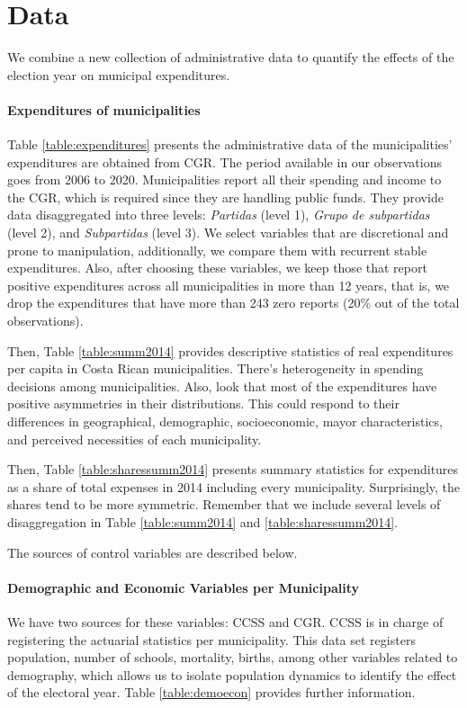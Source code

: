 \section{Data}\label{sec:data}
We combine a new collection of administrative data to quantify the effects of the election year on municipal expenditures. 
\paragraph{Expenditures of municipalities} 
Table \ref{table:expenditures} presents the administrative data of the municipalities' expenditures are obtained from CGR. The period available in our observations goes from 2006 to 2020. Municipalities report all their spending and income to the CGR, which is required since they are handling public funds. They provide data disaggregated into three levels: \textit{Partidas} (level 1), \textit{Grupo de subpartidas} (level 2), and \textit{Subpartidas} (level 3). We select variables that are discretional and prone to manipulation, additionally, we compare them with recurrent stable expenditures. Also, after choosing these variables, we keep those that report positive expenditures across all municipalities in more than 12 years, that is, we drop the expenditures that have more than 243 zero reports (20\% out of the total observations). 

Then, Table \ref{table:summ2014} provides descriptive statistics of real expenditures per capita in Costa Rican municipalities. There's heterogeneity in spending decisions among municipalities. Also, look that most of the expenditures have positive asymmetries in their distributions. This could respond to their differences in geographical, demographic, socioeconomic, mayor characteristics, and perceived necessities of each municipality.  



Then, Table \ref{table:sharessumm2014} presents summary statistics for expenditures as a share of total expenses in 2014 including every municipality. Surprisingly, the shares tend to be more symmetric. Remember that we include several levels of disaggregation in Table \ref{table:summ2014} and \ref{table:sharessumm2014}. 



The sources of control variables are described below. 
\paragraph{Demographic and Economic Variables per Municipality}
We have two sources for these variables: CCSS and CGR. CCSS is in charge of registering the actuarial statistics per municipality. This data set registers population, number of schools, mortality, births, among other variables related to demography, which allows us to isolate population dynamics to identify the effect of the electoral year. Table \ref{table:demoecon} provides further information. 


